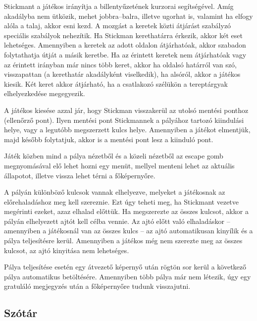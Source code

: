 	Stickmant a játékos irányítja a billentyűzetének kurzorai segítségével. Amíg akadályba nem ütközik, mehet jobbra--balra, illetve ugorhat is, valamint ha elfogy alóla a talaj, akkor esni kezd. A mozgást a keretek közti átjárást szabályzó speciális szabályok nehezítik. Ha Stickman kerethatárra érkezik, akkor két eset lehetséges. Amennyiben a keretek az adott oldalon átjárhatóak, akkor szabadon folytathatja útját a másik keretbe. Ha az érintett keretek nem átjárhatóak vagy az érintett irányban már nincs több keret, akkor ha oldalsó határról van szó, visszapattan (a kerethatár akadályként viselkedik), ha alsóról, akkor a játékos kiesik. Két keret akkor átjárható, ha a csatlakozó szélükön a tereptárgyak elhelyezkedése megegyezik.
	
	A játékos kiesése azzal jár, hogy Stickman visszakerül az utolsó mentési ponthoz (ellenőrző pont). Ilyen mentési pont Stickmannek a pályához tartozó kiindulási helye, vagy a legutóbb megszerzett kulcs helye. Amennyiben a játékot elmentjük, majd később folytatjuk, akkor is a mentési pont lesz a kiinduló pont.
	
	Játék közben mind a pálya nézetből és a közeli nézetből az escape gomb megnyomásával elő lehet hozni egy menüt, mellyel menteni lehet az aktuális állapotot, illetve vissza lehet térni a főképernyőre.
	
	A pályán különböző kulcsok vannak elhelyezve, melyeket a játékosnak az előrehaladáshoz meg kell szereznie. Ezt úgy teheti meg, ha Stickmant vezetve megérinti ezeket, azaz elhalad előttük. Ha megszerezte az összes kulcsot, akkor a pályán elhelyezett ajtót kell célba vennie. Az ajtó előtt való elhaladáskor -- amennyiben a játékosnál van az összes kulcs -- az ajtó automatikusan kinyílik és a pálya teljesítésre kerül. Amennyiben a játékos még nem szerezte meg az összes kulcsot, az ajtó kinyitása nem lehetséges.
	
	Pálya teljesítése esetén egy átvezető képernyő után rögtön sor kerül a következő pálya automatikus betöltésére. Amennyiben több pálya már nem létezik, úgy egy gratuláló megjegyzés után a főképernyőre tudunk visszajutni.

\subsection{Szótár}

